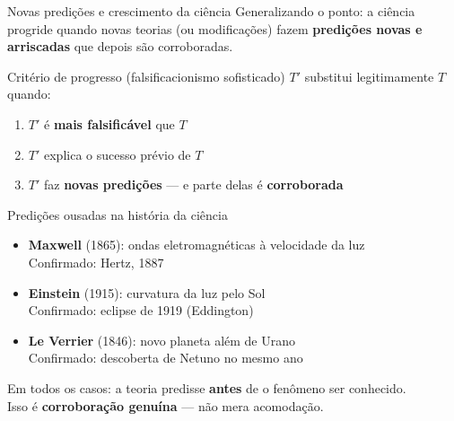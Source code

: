 \documentclass[aspectratio=169]{beamer}
\newcommand{\impt}[1]{\textcolor{maccent}{\textbf{#1}}}
\newcommand{\ntc}[1]{\textcolor{mprimary}{#1}}
\begin{document}
\begin{frame}{Novas predições e crescimento da ciência}
\ntc{Generalizando o ponto:} a ciência progride quando novas teorias (ou modificações) fazem \impt{predições novas e arriscadas} que depois são corroboradas.
\pause
\vspace{0.4cm}
\begin{block}{Critério de progresso (falsificacionismo sofisticado)}
$T'$ substitui legitimamente $T$ quando:
\begin{enumerate}
  \item $T'$ é \impt{mais falsificável} que $T$
  \item $T'$ explica o sucesso prévio de $T$
  \item $T'$ faz \impt{novas predições} --- e parte delas é \impt{corroborada}
\end{enumerate}
\end{block}
\end{frame}

\begin{frame}{Predições ousadas na história da ciência}
\begin{itemize}
  \item \impt{Maxwell} (1865): ondas eletromagnéticas à velocidade da luz \\
        \ntc{Confirmado:} Hertz, 1887
  \pause
  \vspace{0.2cm}
  \item \impt{Einstein} (1915): curvatura da luz pelo Sol \\
        \ntc{Confirmado:} eclipse de 1919 (Eddington)
  \pause
  \vspace{0.2cm}
  \item \impt{Le Verrier} (1846): novo planeta além de Urano \\
        \ntc{Confirmado:} descoberta de Netuno no mesmo ano
\end{itemize}
\pause
\vspace{0.4cm}
\begin{alertblock}{}
Em todos os casos: a teoria predisse \impt{antes} de o fenômeno ser conhecido.\\
Isso é \impt{corroboração genuína} --- não mera acomodação.
\end{alertblock}
\end{frame}
\end{document}
